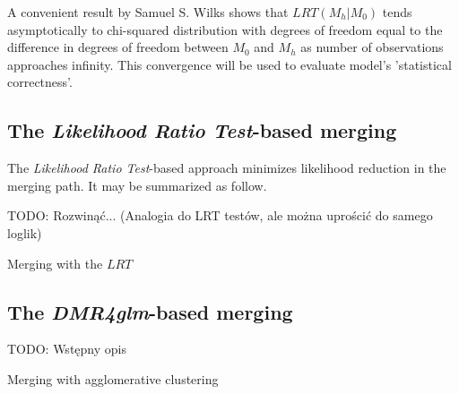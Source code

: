 A convenient result by Samuel S. Wilks \citep{wilks1938large} shows that $LRT(M_h|M_0)$ tends asymptotically to chi-squared distribution with degrees of freedom equal to the difference in degrees of freedom between $M_0$ and $M_h$ as number of observations approaches infinity. This convergence will be used to evaluate model's 'statistical correctness'.




\subsection{The \emph{Likelihood Ratio Test}-based merging}

The \emph{Likelihood Ratio Test}-based approach minimizes likelihood reduction in the merging path. It may be summarized as follow.

TODO: Rozwinąć... (Analogia do LRT testów, ale można uprościć do samego loglik)

\begin{algorithm}[H]
\caption{Merging with the $LRT$}
\begin{algorithmic}[2]

    
\EndWhile
    \EndFunction
\end{algorithmic}
\end{algorithm}

\subsection{The \emph{DMR4glm}-based merging}

TODO: Wstępny opis

\begin{algorithm}[H]
\caption{Merging with agglomerative clustering}
\begin{algorithmic}[2]

\EndFor
        
\Else 
{}
\EndIf
    \EndFunction
\end{algorithmic}
\end{algorithm}


